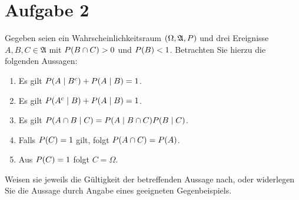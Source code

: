\documentclass{exercise}
\begin{document}
    \section*{Aufgabe 2}

    \begin{problem}
        Gegeben seien ein Wahrscheinlichkeitsraum \(\parentheses*{\Omega, \mathfrak{A}, P}\) und drei Ereignisse \(A, B, C \in \mathfrak{A}\) mit \(P\parentheses*{B \cap C} > 0\) und \(P\parentheses*{B} < 1\).
        Betrachten Sie hierzu die folgenden Aussagen:
        \begin{enumerate}
            \item Es gilt \(P\parentheses*{A \mid B^c} + P\parentheses*{A \mid B} = 1\).
            \item Es gilt \(P\parentheses*{A^c \mid B} + P\parentheses*{A \mid B} = 1\).
            \item Es gilt \(P\parentheses*{A \cap B \mid C} = P\parentheses*{A \mid B \cap C}P\parentheses*{B \mid C}\).
            \item Falls \(P\parentheses*{C} = 1\) gilt, folgt \(P\parentheses*{A \cap C} = P\parentheses*{A}\).
            \item Aus \(P\parentheses*{C} = 1\) folgt \(C = \Omega\).
        \end{enumerate}
        Weisen sie jeweils die Gültigkeit der betreffenden Aussage nach, oder widerlegen Sie die Aussage durch Angabe eines geeigneten Gegenbeispiels.
    \end{problem}
\end{document}

